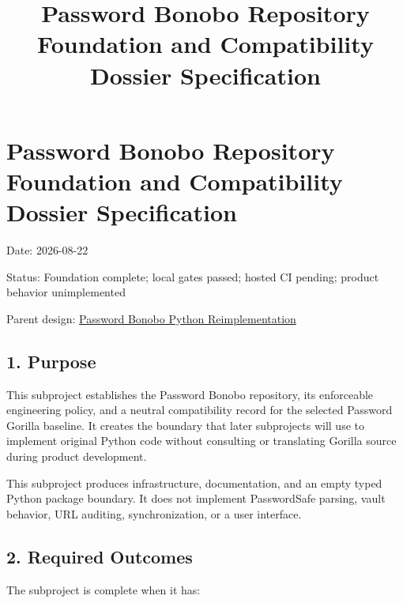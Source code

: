 \documentclass[
  letterpaper,
]{article}
\title{Password Bonobo Repository Foundation and Compatibility Dossier Specification}
\author{}
\date{}
\begin{document}
\maketitle

{
\setcounter{tocdepth}{3}
\tableofcontents
}
\section{Password Bonobo Repository Foundation and Compatibility Dossier
Specification}\label{password-bonobo-repository-foundation-and-compatibility-dossier-specification}

Date: 2026-08-22

Status: Foundation complete; local gates passed; hosted CI pending; product behavior unimplemented

Parent design: \href{./password-bonobo-python-reimplementation-design.md}{Password Bonobo Python Reimplementation}

\subsection{1. Purpose}\label{1-purpose}

This subproject establishes the Password Bonobo repository, its enforceable engineering policy, and a neutral
compatibility record for the selected Password Gorilla baseline. It creates the boundary that later subprojects will use
to implement original Python code without consulting or translating Gorilla source during product development.

This subproject produces infrastructure, documentation, and an empty typed Python package boundary. It does not
implement PasswordSafe parsing, vault behavior, URL auditing, synchronization, or a user interface.

\subsection{2. Required Outcomes}\label{2-required-outcomes}

The subproject is complete when it has:
\end{document}
